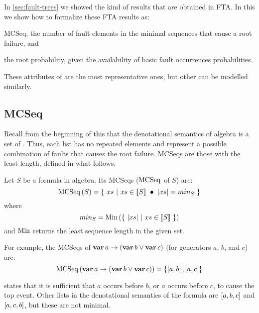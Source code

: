 In \cref{sec:fault-trees} we showed the kind of results that are obtained in \ac{FTA}.
In this  we show how to formalize these \ac{FTA} results as: 
\begin{alineasinline}
  \item \ac{MCSeq}, the number of fault elements in the minimal sequences that cause a root failure, and 
  \item the root probability, given the availability of basic fault occurrences probabilities.
\end{alineasinline}
%
These attributes of  are the most representative ones, but other can be modelled similarly.

\subsection{\Acl{MCSeq}}

Recall from the beginning of this  that the denotational semantics of \ac{algebra} is a set of \distinctlists.
Thus, each list has no repeated elements and represent a possible combination of faults that causes the root failure.
\Acp{MCSeq} are those \distinctlists with the least length, defined in what follows.

\begin{definition}
Let $S$ be a formula in \ac{algebra}.
Its \aclp{MCSeq} ($\operatorname{\mathrm{MCSeq}}$ of $S$) are:
%
\begin{equation}
\operatorname{\mathrm{MCSeq}}\left(S\right) = \left\{~ xs ~\middle|~ xs \in \left[\!\left[S\right]\!\right] ~\bullet~ \left|xs\right| = min_S ~\right\}
\end{equation}
%
where
\[
min_S = \mathrm{Min}\left(\left\{~ \left|xs\right| ~\middle|~ xs \in \left[\!\left[S\right]\!\right] ~\right\}\right)
\]
%
and $\mathrm{Min}$ returns the least sequence length in the given set.
\end{definition}

For example, the \acp{MCSeq} of $\operatorname{\mathbf{var}} a \rightarrow \left(\operatorname{\mathbf{var}} b \lor \operatorname{\mathbf{var}} c\right)$ (for generators $a$, $b$, and $c$) are:
%
\begin{equation}
\operatorname{\mathrm{MCSeq}}\left(\operatorname{\mathbf{var}} a \rightarrow \left(\operatorname{\mathbf{var}} b \lor \operatorname{\mathbf{var}} c\right)\right) = \left\{ \left[ a,b \right], \left[ a,c \right] \right\}\label{eq:mcseq-a-and-b}
\end{equation}

 states that it is sufficient that $a$ occurs before $b$, or $a$ occurs before $c$, to cause the top event.
Other lists in the denotational semantics of the formula are $\left[ a,b,c \right]$ and $\left[ a,c,b \right]$, but these are not minimal.

